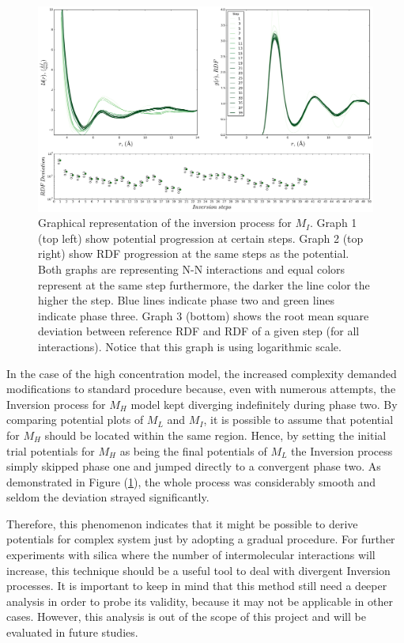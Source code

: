 \documentclass[10pt,a4paper,twoside]{article}
\begin{document}
\begin{figure}[H]
  \begin{center}
	\includegraphics[width=0.98 \textwidth]{./graphs/ConvHigh}
	\caption{\small{Graphical representation of the inversion process for $M_I$. Graph 1 (top left) show potential progression at certain steps. Graph 2 (top right) show RDF progression at the same steps as the potential. Both graphs are representing N-N interactions and equal colors represent at the same step furthermore, the darker the line color the higher the step. Blue lines indicate phase two and green lines indicate phase three.  Graph 3 (bottom) shows the root mean square deviation between reference RDF and RDF of a given step (for all interactions). Notice that this graph is using logarithmic scale.}}
	\label{Fig:convHigh}
  \end{center}
\end{figure} 

\label{subsec:discexp2}
In the case of the high concentration model, the increased complexity demanded modifications to standard procedure because, even with numerous attempts, the Inversion process for $M_H$ model kept diverging indefinitely during phase two. By comparing potential plots of $M_L$ and $M_I$, it is possible to assume that potential for $M_H$ should be located within the same region. Hence, by setting the initial trial potentials for $M_H$ as being the final potentials of $M_L$ the Inversion process simply skipped phase one and jumped directly to a convergent phase two. As demonstrated in Figure (\ref{Fig:convHigh}), the whole process was considerably smooth and seldom the deviation strayed significantly.


Therefore, this phenomenon indicates that it might be possible to derive potentials for complex system just by adopting a gradual procedure. For further experiments with silica where the number of intermolecular interactions will increase, this technique should be a useful tool to deal with divergent Inversion processes. It is important to keep in mind that this method still need a deeper analysis in order to probe its validity, because it may not be applicable in other cases. However, this analysis is out of the scope of this project and will be evaluated in future studies.
\end{document}
